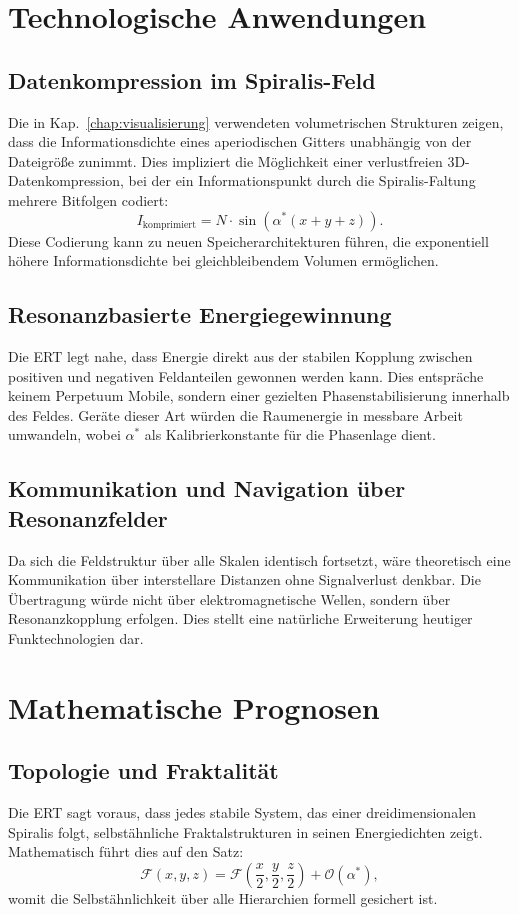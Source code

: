 \section{Technologische Anwendungen}
\label{sec:technologie}
\subsection{Datenkompression im Spiralis-Feld}
Die in Kap.~\ref{chap:visualisierung} verwendeten volumetrischen Strukturen zeigen, 
dass die Informationsdichte eines aperiodischen Gitters unabhängig von der Dateigröße zunimmt. 
Dies impliziert die Möglichkeit einer verlustfreien 3D-Datenkompression, 
bei der ein Informationspunkt durch die Spiralis-Faltung mehrere Bitfolgen codiert:
\[
I_\text{komprimiert} = N \cdot \sin(\alpha^* (x+y+z)).
\]
Diese Codierung kann zu neuen Speicherarchitekturen führen, 
die exponentiell höhere Informationsdichte bei gleichbleibendem Volumen ermöglichen.

\subsection{Resonanzbasierte Energiegewinnung}
Die \acrshort{ERT} legt nahe, dass Energie direkt aus der stabilen Kopplung zwischen positiven und negativen Feldanteilen gewonnen werden kann. 
Dies entspräche keinem Perpetuum Mobile, sondern einer gezielten Phasenstabilisierung innerhalb des Feldes. 
Geräte dieser Art würden die Raumenergie in messbare Arbeit umwandeln, 
wobei \(\alpha^*\) als Kalibrierkonstante für die Phasenlage dient.

\subsection{Kommunikation und Navigation über Resonanzfelder}
Da sich die Feldstruktur über alle Skalen identisch fortsetzt, 
wäre theoretisch eine Kommunikation über interstellare Distanzen ohne Signalverlust denkbar. 
Die Übertragung würde nicht über elektromagnetische Wellen, sondern über Resonanzkopplung erfolgen. 
Dies stellt eine natürliche Erweiterung heutiger Funktechnologien dar.

\section{Mathematische Prognosen}
\label{sec:mathematisch}
\subsection{Topologie und Fraktalität}
Die \acrshort{ERT} sagt voraus, dass jedes stabile System, das einer dreidimensionalen Spiralis folgt, 
selbstähnliche Fraktalstrukturen in seinen Energiedichten zeigt. 
Mathematisch führt dies auf den Satz:
\[
\mathcal{F}(x,y,z) = \mathcal{F}\left(\frac{x}{2},\frac{y}{2},\frac{z}{2}\right) + \mathcal{O}(\alpha^*),
\]
womit die Selbstähnlichkeit über alle Hierarchien formell gesichert ist.

